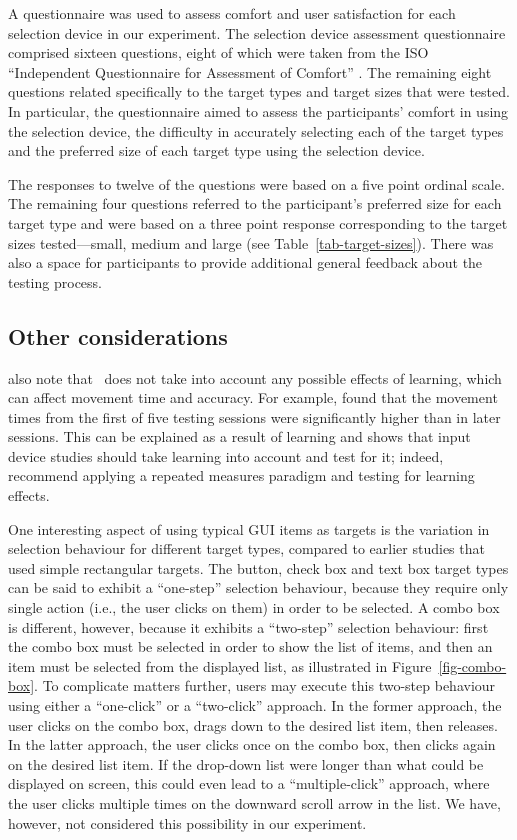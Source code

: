 \documentclass{elsart}
\begin{document}
A questionnaire was used to assess comfort and user satisfaction for
each selection device in our experiment. The selection device assessment
questionnaire comprised sixteen questions, eight of which were taken
from the ISO ``Independent Questionnaire for Assessment of Comfort''
\citep{Doug-SA-1999-CHI}. The remaining eight questions related
specifically to the target types and target sizes that were tested. In
particular, the questionnaire aimed to assess the participants' comfort
in using the selection device, the difficulty in accurately selecting each
of the target types and the preferred size of each target type using the
selection device.

The responses to twelve of the questions were based on a five point
ordinal scale. The remaining four questions referred to the
participant's preferred size for each target type and were based on a
three point response corresponding to the target sizes tested---small,
medium and large (see Table~\ref{tab-target-sizes}). There was also a
space for participants to provide additional general feedback about the
testing process.


\subsection{Other considerations}
\label{sec-evaluation-other}

\citet{Doug-SA-1999-CHI} also note that \ISOnine\ does not take into
account any possible effects of learning, which can affect movement time
and accuracy. For example, \citet{Mack-IS-1991} found that the movement
times from the first of five testing sessions were significantly higher
than in later sessions. This can be explained as a result of learning
and shows that input device studies should take learning into account
and test for it; indeed, \citet{Doug-SA-1999-CHI} recommend applying a
repeated measures paradigm and testing for learning effects.

One interesting aspect of using typical GUI items as targets is the
variation in selection behaviour for different target types, compared to
earlier studies that used simple rectangular targets. The button, check
box and text box target types can be said to exhibit a ``one-step''
selection behaviour, because they require only single action (i.e., the
user clicks on them) in order to be selected. A combo box is different,
however, because it exhibits a ``two-step'' selection behaviour: first
the combo box must be selected in order to show the list of items, and
then an item must be selected from the displayed list, as illustrated in
Figure~\ref{fig-combo-box}. To complicate matters further, users may
execute this two-step behaviour using either a ``one-click'' or a
``two-click'' approach. In the former approach, the user clicks on the
combo box, drags down to the desired list item, then releases. In the
latter approach, the user clicks once on the combo box, then clicks
again on the desired list item. If the drop-down list were longer than
what could be displayed on screen, this could even lead to a
``multiple-click'' approach, where the user clicks multiple times on the
downward scroll arrow in the list. We have, however, not considered this
possibility in our experiment.
\end{document}
